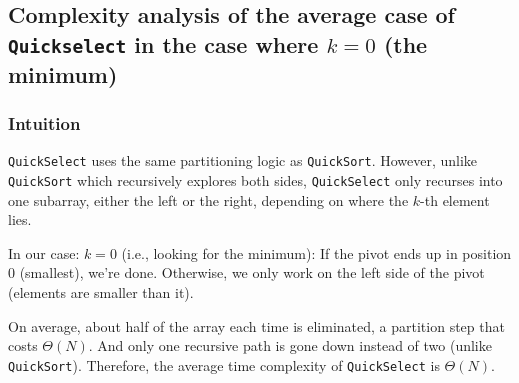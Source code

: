 \documentclass[acmconf,nonacm=true]{acmart}
\begin{document}
    

\subsection{Complexity analysis of the average case of \texttt{Quickselect} in the case where $k=0$ (the minimum)}

\subsubsection{Intuition}
    \texttt{QuickSelect} uses the same partitioning logic as \texttt{QuickSort}. However, unlike \texttt{QuickSort} which recursively explores both sides, \texttt{QuickSelect} only recurses into one subarray, either the left or the right, depending on where the $k$-th element lies.
    
    In our case: $k = 0$ (i.e., looking for the minimum): If the pivot ends up in position 0 (smallest), we’re done. Otherwise, we only work on the left side of the pivot (elements are smaller than it).

    On average, about half of the array each time is eliminated, a partition step that costs $\Theta(N)$. And only one recursive path is gone down instead of two (unlike \texttt{QuickSort}). Therefore, the average time complexity of \texttt{QuickSelect} is $\Theta(N)$.
\end{document}
